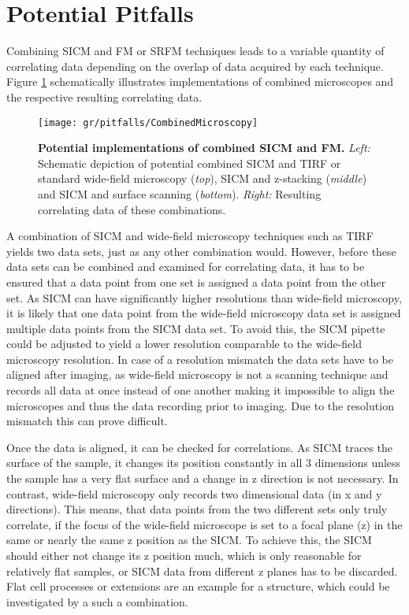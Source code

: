 \section{Potential Pitfalls}
\label{sec:pitfalls}

Combining SICM and FM or SRFM techniques leads to a variable quantity of 
correlating data depending on the overlap of data acquired by each technique.
Figure \ref{fig:CombinedMicroscopy} schematically illustrates implementations 
of combined microscopes and the respective resulting correlating data. 

\begin{figure}
  \sidecaption
  \texttt{[image: gr/pitfalls/CombinedMicroscopy]}%
  \caption{\textbf{Potential implementations of combined SICM and FM.} 
  			\textit{Left:} Schematic depiction of potential combined SICM 
  			and TIRF or standard wide-field microscopy (\textit{top}),
  			SICM and z-stacking (\textit{middle}) and SICM and surface
  			scanning (\textit{bottom}). 
  			\textit{Right:} Resulting correlating data of these combinations.}
  \label{fig:CombinedMicroscopy}
\end{figure}

A combination of SICM and wide-field microscopy techniques such as TIRF yields
two data sets, just as any other combination would. However, before these data
sets can be combined and examined for correlating data, it has to be ensured that 
a data point from one set is assigned a data point from the other set. As SICM 
can have significantly higher resolutions than wide-field microscopy, it is 
likely that one data point from the wide-field microscopy data set is assigned 
multiple data points from the SICM data set. To avoid this, the SICM pipette 
could be adjusted to yield a lower resolution comparable to the wide-field 
microscopy resolution. In case of a resolution mismatch the data sets have to be
aligned after imaging, as wide-field microscopy is not a scanning technique and
records all data at once instead of one another making it impossible to align the
microscopes and thus the data recording prior to imaging. Due to the resolution
mismatch this can prove difficult.

Once the data is aligned, it can be checked for correlations. As SICM traces the 
surface of the sample, it changes its position constantly in all 3 dimensions unless
the sample has a very flat surface and a change in z direction is not necessary.
In contrast, wide-field microscopy only records two dimensional data (in x and y
directions). This means, that data points from the two different sets only truly 
correlate, if the focus of the wide-field microscope is set to a focal plane (z)
in the same or nearly the same z position as the SICM. To achieve this, the SICM
should either not change its z position much, which is only reasonable for
relatively flat samples, or SICM data from different z planes has to be discarded.
Flat cell processes or extensions are an example for a structure, which could be 
investigated by a such a combination.

